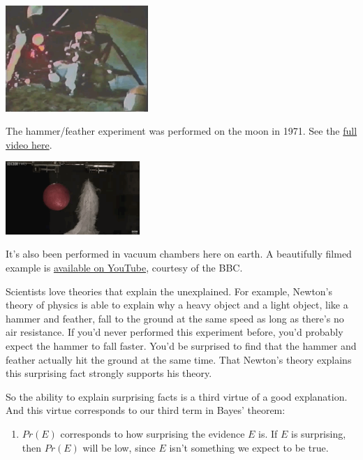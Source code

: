 \documentclass[justified]{tufte-book}
\providecommand{\tightlist}{%
  \setlength{\itemsep}{0pt}\setlength{\parskip}{0pt}}
\newcommand{\p}{Pr}
\theoremstyle{definition}
\theoremstyle{definition}
\theoremstyle{definition}
\theoremstyle{remark}
\begin{document}
\begin{marginfigure}
\includegraphics[width=2.12in]{img/moon} \caption[The hammer/feather experiment was performed on the moon in 1971. See the \href{https://bit.ly/1KLQzOB}{full video here}.]{The hammer/feather experiment was performed on the moon in 1971. See the \href{https://bit.ly/1KLQzOB}{full video here}.}\label{fig:unnamed-chunk-92}
\end{marginfigure}
\begin{marginfigure}
\includegraphics[width=2in]{img/vacuum} \caption[It's also been performed in vacuum chambers here on earth. A beautifully filmed example is \href{https://bit.ly/10hw8mP}{available on YouTube}, courtesy of the BBC.]{It's also been performed in vacuum chambers here on earth. A beautifully filmed example is \href{https://bit.ly/10hw8mP}{available on YouTube}, courtesy of the BBC.}\label{fig:unnamed-chunk-92}
\end{marginfigure}

Scientists love theories that explain the unexplained. For example, Newton's theory of physics is able to explain why a heavy object and a light object, like a hammer and feather, fall to the ground at the same speed as long as there's no air resistance. If you'd never performed this experiment before, you'd probably expect the hammer to fall faster. You'd be surprised to find that the hammer and feather actually hit the ground at the same time. That Newton's theory explains this surprising fact strongly supports his theory.

So the ability to explain surprising facts is a third virtue of a good explanation. And this virtue corresponds to our third term in Bayes' theorem:

\begin{enumerate}
\def\labelenumi{\arabic{enumi}.}
\setcounter{enumi}{2}
\tightlist
\item
  \(\p(E)\) corresponds to how surprising the evidence \(E\) is. If \(E\) is surprising, then \(\p(E)\) will be low, since \(E\) isn't something we expect to be true.
\end{enumerate}
\end{document}
